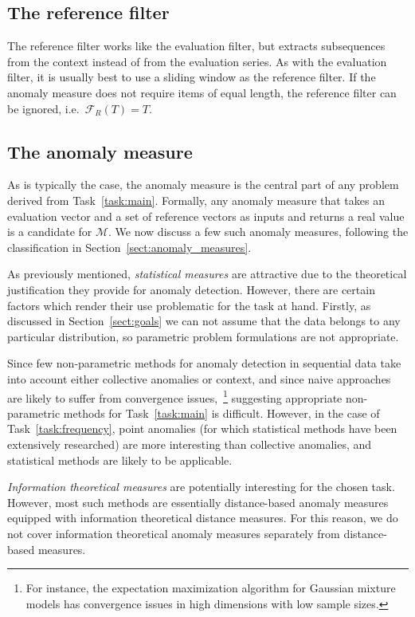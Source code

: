 \subsection{The reference filter}

The reference filter works like the evaluation filter, but extracts subsequences from the context instead of from the evaluation series. As with the evaluation filter, it is usually best to use a sliding window as the reference filter. If the anomaly measure does not require items of equal length, the reference filter can be ignored, i.e.\  $\mathcal{F}_R(T) = T$.

\subsection{The anomaly measure}

As is typically the case, the anomaly measure is the central part of any problem derived from Task~\ref{task:main}. Formally, any anomaly measure that takes an evaluation vector and a set of reference vectors as inputs and returns a real value is a candidate for $\mathcal{M}$. We now discuss a few such anomaly measures, following the classification in Section~\ref{sect:anomaly_measures}.

As previously mentioned, \emph{statistical measures} are attractive due to the theoretical justification they provide for anomaly detection. However, there are certain factors which render their use problematic for the task at hand. Firstly, as discussed in Section~\ref{sect:goals} we can not assume that the data belongs to any particular distribution, so parametric problem formulations are not appropriate.

Since few non-parametric methods for anomaly detection in sequential data take into account either collective anomalies or context, and since naive approaches are likely to suffer from convergence issues,~\footnote{For instance, the expectation maximization algorithm for Gaussian mixture models has convergence issues in high dimensions with low sample sizes.} suggesting appropriate non-parametric methods for Task~\ref{task:main} is difficult. However, in the case of Task~\ref{task:frequency}, point anomalies (for which statistical methods have been extensively researched) are more interesting than collective anomalies, and statistical methods are likely to be applicable.

\emph{Information theoretical measures} are potentially interesting for the chosen task. However, most such methods are essentially distance-based anomaly measures equipped with information theoretical distance measures. For this reason, we do not cover information theoretical anomaly measures separately from distance-based measures.


